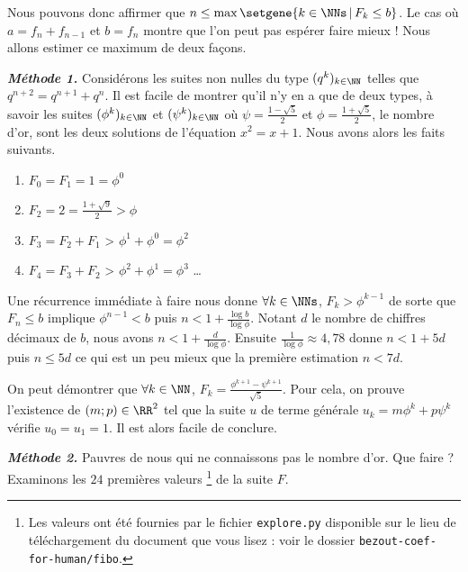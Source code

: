 \medskip


Nous pouvons donc affirmer que $n \leq \max \setgene{k \in \NNs \,|\, F_k \leq b}$. Le cas où $a = f_n + f_{n-1}$ et $b = f_n$ montre que l'on peut pas espérer faire mieux ! Nous allons estimer ce maximum de deux façons.




\bigskip


\emph{\bfseries Méthode 1.}
Considérons les suites non nulles du type $(q^k)_{k \in \NN}$ telles que $q^{n+2} = q^{n+1} + q^n$.
Il est facile de montrer qu'il n'y en a que de deux types, à savoir les suites $(\phi^k)_{k \in \NN}$ et $(\psi^k)_{k \in \NN}$ où $\psi = \frac{1 - \sqrt{5}}{2}$ et $\phi = \frac{1 + \sqrt{5}}{2}$, le nombre d'or, sont les deux solutions de l'équation $x^2 = x +1$. Nous avons alors les faits suivants.

\begin{enumerate}
	\item $F_0 = F_1 = 1 = \phi^0$

	\item $F_2 = 2 = \frac{1 + \sqrt{9}}{2} > \phi$

	\item $F_3 = F_2 + F_1$ > $\phi^1 + \phi^0 = \phi^2$

	\item $F_4 = F_3 + F_2$ > $\phi^2 + \phi^1 = \phi^3$ \dots
\end{enumerate}


Une récurrence immédiate à faire nous donne $\forall k \in \NNs$, $F_k > \phi^{k-1}$ de sorte que $F_n \leq b$ implique $\phi^{n-1} < b$ puis $n < 1 + \frac{\log b}{\log \phi}$.
Notant $d$ le nombre de chiffres décimaux de $b$, nous avons $n < 1 + \frac{d}{\log \phi}$. 
Ensuite $\frac{1}{\log \phi} \approx 4,78$ donne $n < 1 + 5d$ puis $n \leq 5d$ ce qui est un peu mieux que la première estimation $n < 7d$.


\begin{remark}
	On peut démontrer que $\forall k \in \NN$, $F_k = \frac{\phi^{k+1} - \psi^{k+1}}{\sqrt{5}}$.
	Pour cela, on prouve l'existence de $(m ;p) \in \RR^2$ tel que la suite $u$ de terme générale $u_k = m \phi^k  + p \psi^k$ vérifie $u_0 = u_1 = 1$. Il est alors facile de conclure.
\end{remark}




\bigskip


\emph{\bfseries Méthode 2.}
Pauvres de nous qui ne connaissons pas le nombre d'or.
Que faire ? Examinons les $24$ premières valeurs
\footnote{
	Les valeurs ont été fournies par le fichier \texttt{explore.py} disponible  sur le lieu de téléchargement du document que vous lisez : voir le dossier \texttt{bezout-coef-for-human/fibo}.
}
de la suite $F$.

